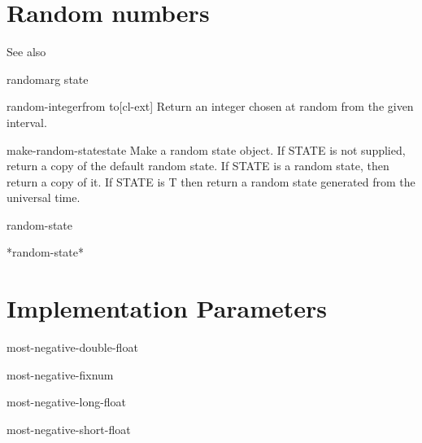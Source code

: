 \documentclass[10pt,english]{book}
\begin{document}
\section{Random numbers}
\label{sec:random-numbers}

See also 

\begin{function}{random}{arg \op state}
  
\end{function}

\begin{function}{random-integer}{from to}[cl-ext]
  Return an integer chosen at random from the given interval.
\end{function}

\begin{function}{make-random-state}{\op state}
  Make a random state object. If STATE is not supplied, return a copy
  of the default random state. If STATE is a random state, then return a
  copy of it. If STATE is T then return a random state generated from
  the universal time.
\end{function}

\begin{class}{random-state}{}
  
\end{class}

\begin{variable}{*random-state*}{}
  
\end{variable}

\section{Implementation Parameters}
\label{sec:impl-param}

\begin{constant}{most-negative-double-float}{}
  
\end{constant}

\begin{constant}{most-negative-fixnum}{}
  
\end{constant}

\begin{constant}{most-negative-long-float}{}
  
\end{constant}

\begin{constant}{most-negative-short-float}{}
  
\end{constant}
\end{document}
